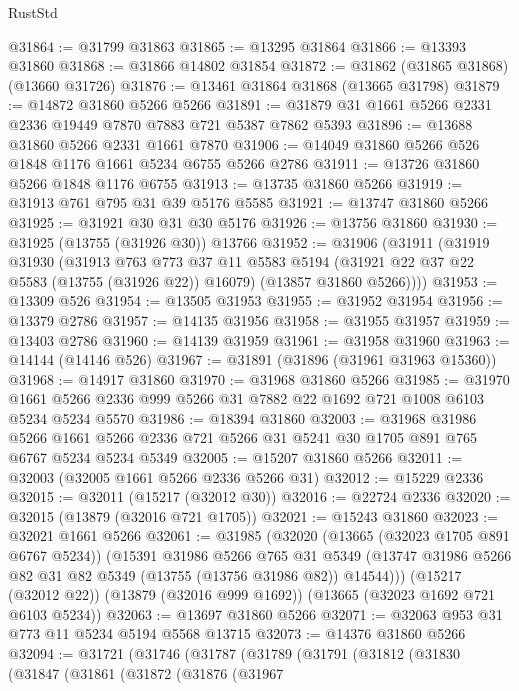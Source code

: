 \begin{lexlean}{RustStd}
\begin{coremodule}
@31864 := @31799 @31863
@31865 := @13295 @31864
@31866 := @13393 @31860
@31868 := @31866 @14802 @31854
@31872 := @31862 (@31865 @31868) (@13660 @31726)
@31876 := @13461 @31864 @31868 (@13665 @31798)
@31879 := @14872 @31860 @5266 @5266
@31891 := @31879 @31 @1661 @5266 @2331 @2336 @19449 @7870 @7883 @721 @5387 @7862 @5393
@31896 := @13688 @31860 @5266 @2331 @1661 @7870
@31906 := @14049 @31860 @5266 @526 @1848 @1176 @1661 @5234 @6755 @5266 @2786
@31911 := @13726 @31860 @5266 @1848 @1176 @6755
@31913 := @13735 @31860 @5266
@31919 := @31913 @761 @795 @31 @39 @5176 @5585
@31921 := @13747 @31860 @5266
@31925 := @31921 @30 @31 @30 @5176
@31926 := @13756 @31860
@31930 := @31925 (@13755 (@31926 @30)) @13766
@31952 := @31906
    (@31911
      (@31919
        @31930
        (@31913
          @763
          @773
          @37
          @11
          @5583
          @5194
          (@31921 @22 @37 @22 @5583 (@13755 (@31926 @22)) @16079)
          (@13857 @31860 @5266))))
@31953 := @13309 @526
@31954 := @13505 @31953
@31955 := @31952 @31954
@31956 := @13379 @2786
@31957 := @14135 @31956
@31958 := @31955 @31957
@31959 := @13403 @2786
@31960 := @14139 @31959
@31961 := @31958 @31960
@31963 := @14144 (@14146 @526)
@31967 := @31891 (@31896 (@31961 @31963 @15360))
@31968 := @14917 @31860
@31970 := @31968 @31860 @5266
@31985 := @31970 @1661 @5266 @2336 @999 @5266 @31 @7882 @22 @1692 @721 @1008 @6103 @5234 @5234 @5570
@31986 := @18394 @31860
@32003 := @31968
    @31986
    @5266
    @1661
    @5266
    @2336
    @721
    @5266
    @31
    @5241
    @30
    @1705
    @891
    @765
    @6767
    @5234
    @5234
    @5349
@32005 := @15207 @31860 @5266
@32011 := @32003 (@32005 @1661 @5266 @2336 @5266 @31)
@32012 := @15229 @2336
@32015 := @32011 (@15217 (@32012 @30))
@32016 := @22724 @2336
@32020 := @32015 (@13879 (@32016 @721 @1705))
@32021 := @15243 @31860
@32023 := @32021 @1661 @5266
@32061 := @31985
    (@32020
      (@13665 (@32023 @1705 @891 @6767 @5234))
      (@15391
        @31986
        @5266
        @765
        @31
        @5349
        (@13747 @31986 @5266 @82 @31 @82 @5349 (@13755 (@13756 @31986 @82)) @14544)))
    (@15217 (@32012 @22))
    (@13879 (@32016 @999 @1692))
    (@13665 (@32023 @1692 @721 @6103 @5234))
@32063 := @13697 @31860 @5266
@32071 := @32063 @953 @31 @773 @11 @5234 @5194 @5568 @13715
@32073 := @14376 @31860 @5266
@32094 := @31721
    (@31746
      (@31787
        (@31789
          (@31791
            (@31812
              (@31830
                (@31847
                  (@31861
                    (@31872
                      (@31876
                        (@31967

\end{coremodule}
\end{lexlean}

